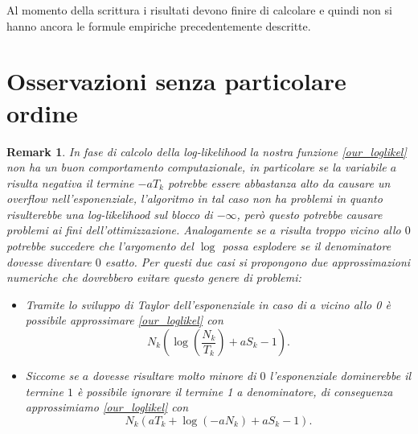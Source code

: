 \documentclass[10pt,a4paper]{report}
\newtheorem{remark}{Remark}
\begin{document}
Al momento della scrittura i risultati devono finire di calcolare e quindi non si hanno ancora le formule empiriche precedentemente descritte.
\section{Osservazioni senza particolare ordine}
\begin{remark}
In fase di calcolo della log-likelihood la nostra funzione \eqref{our_loglikel} non ha un buon comportamento computazionale, in particolare se la variabile $a$ risulta negativa il termine $-aT_k$ potrebbe essere abbastanza alto da causare un overflow nell'esponenziale, l'algoritmo in tal caso non ha problemi in quanto risulterebbe una log-likelihood sul blocco di $-\infty$, però questo potrebbe causare problemi ai fini dell'ottimizzazione. Analogamente se $a$ risulta troppo vicino allo $0$ potrebbe succedere che l'argomento del $\log$ possa esplodere se il denominatore dovesse diventare $0$ esatto. Per questi due casi si propongono due approssimazioni numeriche che dovrebbero evitare questo genere di problemi:
\begin{itemize}
\item Tramite lo sviluppo di Taylor dell'esponenziale in caso di $a$ vicino allo 0 è possibile approssimare \eqref{our_loglikel} con
$$
N_k\left(\log\left(\frac{N_k}{T_k}\right)+aS_k-1\right).
$$
\item Siccome se $a$ dovesse risultare molto minore di $0$ l'esponenziale dominerebbe il termine $1$ è possibile ignorare il termine 1 a denominatore, di conseguenza approssimiamo \eqref{our_loglikel} con 
$$
N_k\left(aT_k+\log(-aN_k)+aS_k-1\right).
$$
\end{itemize}
\end{remark}
\end{document}
